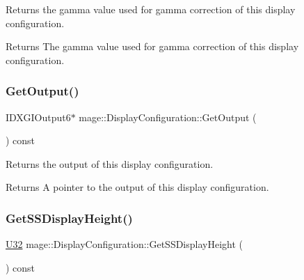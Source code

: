 Returns the gamma value used for gamma correction of this display configuration.

\begin{DoxyReturn}{Returns}
The gamma value used for gamma correction of this display configuration. 
\end{DoxyReturn}
\hypertarget{structmage_1_1_display_configuration_a63cb03e85bb8c4b2a77106a6c208de3b}{}\label{structmage_1_1_display_configuration_a63cb03e85bb8c4b2a77106a6c208de3b} 
\subsubsection{\texorpdfstring{Get\+Output()}{GetOutput()}}
{\footnotesize\ttfamily I\+D\+X\+G\+I\+Output6$\ast$ mage\+::\+Display\+Configuration\+::\+Get\+Output (\begin{DoxyParamCaption}{ }\end{DoxyParamCaption}) const\hspace{0.3cm}{\ttfamily [noexcept]}}

Returns the output of this display configuration.

\begin{DoxyReturn}{Returns}
A pointer to the output of this display configuration. 
\end{DoxyReturn}
\hypertarget{structmage_1_1_display_configuration_a9f3bec318a03e7f6d2cc8586e5770f43}{}\label{structmage_1_1_display_configuration_a9f3bec318a03e7f6d2cc8586e5770f43} 
\subsubsection{\texorpdfstring{Get\+S\+S\+Display\+Height()}{GetSSDisplayHeight()}}
{\footnotesize\ttfamily \hyperlink{namespacemage_a41c104c036fba3756a74e19f793eeaa1}{U32} mage\+::\+Display\+Configuration\+::\+Get\+S\+S\+Display\+Height (\begin{DoxyParamCaption}{ }\end{DoxyParamCaption}) const\hspace{0.3cm}{\ttfamily [noexcept]}}

